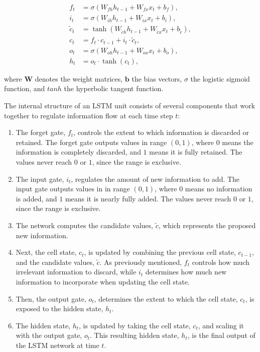 \documentclass[
  letterpaper,
  double,
  12pt,
  1.0in]{beavtex}
\begin{document}
\begin{equation}
\begin{split}
\label{eq:lstm}
f_t &= \sigma(W_{fh} h_{t-1} + W_{fx} x_t + b_f), \\
i_t &= \sigma(W_{ih} h_{t-1} + W_{ix} x_t + b_i), \\
\tilde{c}_t &= \tanh(W_{\tilde{c} h} h_{t-1} + W_{\tilde{c} x} x_t + b_{\tilde{c}}), \\
c_t &= f_t \cdot c_{t-1} + i_t \cdot \tilde{c}_t, \\
o_t &= \sigma(W_{oh} h_{t-1} + W_{ox} x_t + b_o), \\
h_t &= o_t \cdot \tanh(c_t), 
\end{split}
\end{equation}

where \(\boldsymbol{W}\) denotes the weight matrices, \(\boldsymbol{b}\)
the bias vectors, \(\sigma\) the logistic sigmoid function, and \(tanh\)
the hyperbolic tangent function.

The internal structure of an LSTM unit consists of several components
that work together to regulate information flow at each time step \(t\):

\begin{enumerate}
\def\labelenumi{\arabic{enumi}.}
\item
  The forget gate, \(f_t\), controls the extent to which information is
  discarded or retained. The forget gate outputs values in range
  \((0, 1)\), where \(0\) means the information is completely discarded,
  and \(1\) means it is fully retained. The values never reach \(0\) or
  \(1\), since the range is exclusive.
\item
  The input gate, \(i_t\), regulates the amount of new information to
  add. The input gate outputs values in in range \((0, 1)\), where \(0\)
  means no information is added, and \(1\) means it is nearly fully
  added. The values never reach \(0\) or \(1\), since the range is
  exclusive.
\item
  The network computes the candidate values, \(\tilde{c}\), which
  represents the proposed new information.
\item
  Next, the cell state, \(c_t\), is updated by combining the previous
  cell state, \(c_{t-1}\), and the candidate values, \(\tilde{c}\). As
  previously mentioned, \(f_t\) controls how much irrelevant information
  to discard, while \(i_t\) determines how much new information to
  incorporate when updating the cell state.
\item
  Then, the output gate, \(o_t\), determines the extent to which the
  cell state, \(c_t\), is exposed to the hidden state, \(h_t\).
\item
  The hidden state, \(h_t\), is updated by taking the cell state,
  \(c_t\), and scaling it with the output gate, \(o_t\). This resulting
  hidden state, \(h_t\), is the final output of the LSTM network at time
  \(t\).
\end{enumerate}
\end{document}
